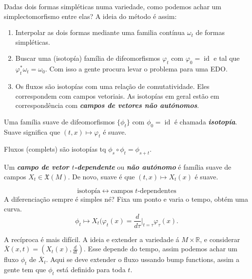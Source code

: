 Dadas dois formas simpl\'eticas numa variedade, como podemos achar um simplectomorfismo entre elas? A ideia do m\'etodo \'e assim:

\begin{enumerate}[label=\textbf{Step \arabic*}]
	\item Interpolar as dois formas mediante uma familia cont\'inua $\omega_t$ de formas simpl\'eticas.

	\item Buscar uma (isotop\'ia) fam\'ilia de difeomorfismos $\varphi_t$ com $\varphi_0=\operatorname{id}$ e tal que $\varphi^*_t\omega_t=\omega_0$. Com isso a gente procura levar o problema para uma EDO.

	\item Os fluxos s\~ao isotop\'ias com uma rela\c c\~ao de comutatividade. Eles correspondem com campos vetoriais. As isotop\'ias em geral est\~ao em correspond\^encia com \textit{\textbf{campos de vetores n\~ao aut\'onomos}}.
\end{enumerate}

\begin{defn}
	Uma fam\'ilia suave de difeomorfismos $\{\phi_t\}$ com $\phi_0=\operatorname{id}$ \'e chamada \textit{\textbf{isotop\'ia}}. Suave significa que $(t,x)\mapsto \varphi_t$ \'e suave.
\end{defn}

\begin{example}
	Fluxos (complets) s\~ao isotop\'ias tq $\phi_s\circ \phi_t=\phi_{s+t}$.
\end{example}

\begin{defn}
	Um \textit{\textbf{campo de vetor $t$-dependente}} ou  \textit{\textbf{n\~ao aut\'onomo}} \'e fam\'ilia suave de campos $X_t\in\mathfrak{X}(M)$. De novo, suave \'e que $(t,x)\mapsto X_t(x)$ \'e suave.
\end{defn}

\[\text{isotop\'ia} \leftrightarrow \text{campos $t$-dependentes}  \]
A diferencia\c c\~ao sempre \'e simples n\'e? Fixa um ponto e varia o tempo, obt\'em uma curva.
\[\phi_t\mapsto X_t(\varphi_t(x)=\frac{d}{d\tau}|_{t=\tau}\varphi_\tau(x).\]

A rec\'iproca \'e mais dif\'icil. A ideia e extender a variedade  \'a $M\times \mathbb{R}$, e considerar $\overline{X}(x,t)=(X_t(x),\frac{d}{dt})$. Esse depende do tempo, assim podemos achar um fluxo $\phi_t$ de $\overline{X}_t$. Aqui se deve extender o fluxo ussando bump functions, assim a gente tem que $\phi_t$ est\'a definido para toda $t$.

